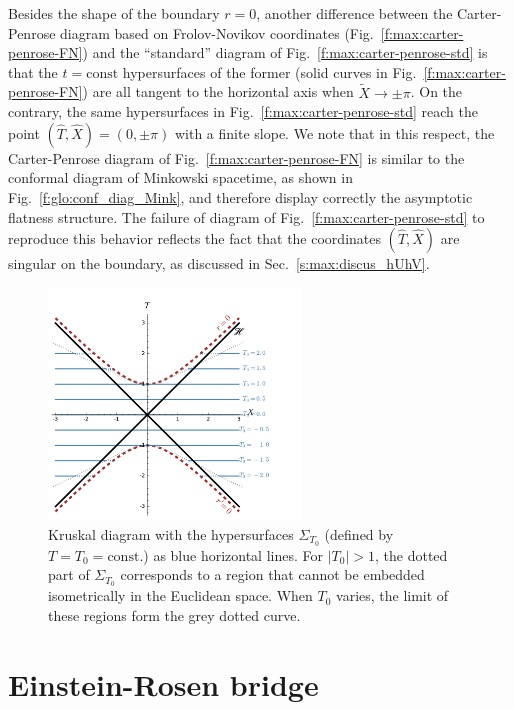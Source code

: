 Besides the shape of the boundary $r=0$, another difference between
the Carter-Penrose diagram based on Frolov-Novikov coordinates
(Fig.~\ref{f:max:carter-penrose-FN}) and the ``standard'' diagram
of Fig.~\ref{f:max:carter-penrose-std} is that the $t=\mathrm{const}$
hypersurfaces of the former (solid curves in Fig.~\ref{f:max:carter-penrose-FN})
are all tangent to the horizontal axis when $\tilde{X}\rightarrow \pm\pi$.
On the contrary, the same hypersurfaces in Fig.~\ref{f:max:carter-penrose-std}
reach the point $(\hat{T},\hat{X}) = (0,\pm\pi)$ with a finite slope.
We note that in this respect, the Carter-Penrose diagram of
Fig.~\ref{f:max:carter-penrose-FN} is similar to the conformal diagram of
Minkowski spacetime, as shown in Fig.~\ref{f:glo:conf_diag_Mink}, and
therefore display correctly the asymptotic flatness structure.
The failure of diagram of Fig.~\ref{f:max:carter-penrose-std} to reproduce
this behavior reflects the fact that the coordinates $(\hat{T},\hat{X})$ are singular on the
boundary, as discussed in Sec.~\ref{s:max:discus_hUhV}.

\begin{figure}
\centerline{\includegraphics[width=0.6\textwidth]{max_constant_T_slices.pdf}}
\caption[]{\label{f:max:constant_T_slices} \footnotesize
Kruskal diagram with the hypersurfaces $\Sigma_{T_0}$ (defined by $T=T_0 = \mathrm{const.}$) as blue horizontal lines. For $|T_0|>1$, the dotted part of
$\Sigma_{T_0}$ corresponds to a region that cannot be embedded isometrically in
the Euclidean space. When $T_0$ varies, the limit of these regions form
the grey dotted curve.}
\end{figure}


\section{Einstein-Rosen bridge}


